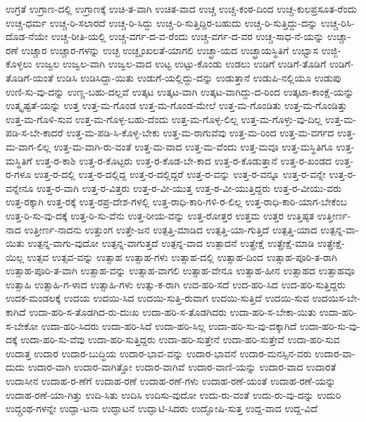 {ಉಗ್ರತೆ
ಉಗ್ರಾಣ-ದಲ್ಲಿ
ಉಗ್ರಾಣಕ್ಕೆ
ಉಚಿ-ತ-ವಾಗಿ
ಉಚಿತ-ವಾದ
ಉಚ್ಚ
ಉಚ್ಚ-ಕಂಠ-ದಿಂದ
ಉಚ್ಚ-ಕುಲಪ್ರಸೂತ-ರೆಂದು
ಉಚ್ಚ-ಧರ್ಮ
ಉಚ್ಚ-ರಿ-ಸಲಾರದೆ
ಉಚ್ಚ-ರಿ-ಸಿದ್ದು
ಉಚ್ಚ-ರಿ-ಸುತ್ತಿದ್ದಿರ-ಬಹುದು
ಉಚ್ಚ-ರಿ-ಸುತ್ತಿದ್ದು-ದನ್ನು
ಉಚ್ಚ-ರಿಸಿ-ದೊಡ-ನೆಯೇ
ಉಚ್ಚ-ರೀತಿ-ಯಲ್ಲಿ
ಉಚ್ಚ-ವರ್ಗ-ದ-ವ-ರೆಂದು
ಉಚ್ಚ-ವರ್ಗ-ದ-ವರ
ಉಚ್ಚ-ಸಾಧ-ನೆ-ಯನ್ನು
ಉಚ್ಚಾ-ರಣೆ
ಉಚ್ಚಾರ
ಉಚ್ಚಾರ-ಗಳನ್ನು
ಉಚ್ಛ
ಉಚ್ಛೃಂಖಲತೆ-ಯಾಗಲಿ
ಉಚ್ಛ್ರಾ-ಯದ
ಉಚ್ಛ್ರಾಯಸ್ಥಿತಿಗೆ
ಉಛ್ವಾಸ
ಉಜ್ಜಿ-ಕೊಳ್ಳಲು
ಉಜ್ವಲ
ಉಜ್ವಲ-ವಾಗಿ
ಉಜ್ವಲ-ವಾದ
ಉಟ್ಟ
ಉಟ್ಟು-ಕೊಂಡು
ಉಡಲು
ಉಡಿಗೆ
ಉಡಿಗೆ-ತೊಡಿಗೆ
ಉಡಿಗೆ-ತೊಡಿಗೆ-ಯಂತೆ
ಉಡಿಸಿ
ಉಡಿಸಿದ್ದಾ-ಯಿತು
ಉಡುಗೆ-ಯಲ್ಲಿದ್ದು-ದನ್ನು
ಉಡುತ್ತಾನೆ
ಉಡುಪಿ-ನಲ್ಲಿಯೂ
ಉಡುಪು
ಉಣಿ-ಸು-ವು-ದನ್ನು
ಉಣ್ಣ-ಬಹು-ದಲ್ಲವೆ
ಉತ್ಕಟ
ಉತ್ಕಟ-ವಾಗಿ
ಉತ್ಕಟ-ವಾಗಿದ್ದು-ದ-ರಿಂದ
ಉತ್ಕಟಾ-ಕಾಂಕ್ಷೆ-ಯನ್ನು
ಉತ್ಕೃಷ್ಟತೆ-ಯನ್ನು
ಉತ್ತ
ಉತ್ತ-ಮ-ಗೊಂಡ
ಉತ್ತ-ಮ-ಗೊಂಡ-ಮೇಲೆ
ಉತ್ತ-ಮ-ಗೊಂಡಿತು
ಉತ್ತ-ಮ-ಗೊಂಡಿತ್ತು
ಉತ್ತ-ಮ-ಗೊಳಿ-ಸುವ
ಉತ್ತ-ಮ-ಗೊಳ್ಳ-ಬಹು-ದೆಂದು
ಉತ್ತ-ಮ-ಗೊಳ್ಳ-ಲಿಲ್ಲ
ಉತ್ತ-ಮ-ಗೊಳ್ಳು-ವು-ದಿಲ್ಲ
ಉತ್ತ-ಮ-ಪಡಿ-ಸ-ಬೇ-ಕಾದರೆ
ಉತ್ತ-ಮ-ಪಡಿ-ಸಿ-ಕೊಳ್ಳ-ಬೇಕು
ಉತ್ತ-ಮ-ರಾಗುವೆವು
ಉತ್ತ-ಮ-ರಿಂದ
ಉತ್ತ-ಮ-ವರ್ಗದ
ಉತ್ತ-ಮ-ವಾಗ-ಲಿಲ್ಲ
ಉತ್ತ-ಮ-ವಾಗಿ-ರು-ವಂತೆ
ಉತ್ತ-ಮ-ವಾದ
ಉತ್ತ-ಮ-ವೆಂದು
ಉತ್ತ-ಮವೂ
ಉತ್ತ-ಮಸ್ಥಿತಿಗೂ
ಉತ್ತ-ಮಸ್ಥಿತಿಗೆ
ಉತ್ತ-ರ-ಕಾಶಿ
ಉತ್ತ-ರ-ಕೊಟ್ಟರು
ಉತ್ತ-ರ-ಕೊಡ-ಬೇ-ಕಾದ
ಉತ್ತ-ರ-ಕೊಡುತ್ತಾನೆ
ಉತ್ತ-ರ-ಖಂಡದ
ಉತ್ತ-ರ-ಗಳೂ
ಉತ್ತ-ರ-ದಲ್ಲಿ
ಉತ್ತ-ರ-ದಲ್ಲಿದ್ದ
ಉತ್ತ-ರ-ದಲ್ಲಿದ್ದರೆ
ಉತ್ತ-ರ-ವನ್ನು
ಉತ್ತ-ರ-ವನ್ನೂ
ಉತ್ತ-ರ-ವನ್ನೇ
ಉತ್ತ-ರ-ವನ್ನೇನೂ
ಉತ್ತ-ರ-ವಾಗಿ
ಉತ್ತ-ರ-ವಿತ್ತರು
ಉತ್ತ-ರ-ವೀ-ಯುತ್ತ
ಉತ್ತ-ರ-ವೀ-ಯುತ್ತಿದ್ದರು
ಉತ್ತ-ರ-ವೀಯು-ವರು
ಉತ್ತ-ರಕ್ಕಾಗಿ
ಉತ್ತ-ರಕ್ಕೆ
ಉತ್ತ-ರಪ್ರ-ದೇಶ-ಗಳಲ್ಲಿ
ಉತ್ತ-ರಾಧಿ-ಕಾರಿ-ಗಳಿ-ರ-ಲಿಲ್ಲ
ಉತ್ತ-ರಾಧಿ-ಕಾರಿ-ಯಾಗ-ಬೇಕೆಂಬ
ಉತ್ತ-ರಿ-ಸು-ವು-ದಕ್ಕೆ
ಉತ್ತ-ರಿ-ಸು-ವೆನು
ಉತ್ತ-ರೀಯ-ವನ್ನು
ಉತ್ತ-ರೋತ್ತರ
ಉತ್ತಮ
ಉತ್ತರ
ಉತ್ತಿಷ್ಠತ
ಉತ್ತೀರ್ಣ-ನಾದ
ಉತ್ತೀರ್ಣ-ನಾದನು
ಉತ್ತುಂಗ
ಉತ್ತೇ-ಜನ
ಉತ್ಪತ್ತಿ-ಮಾಡಿದ
ಉತ್ಪತ್ತಿ-ಯಾ-ಗುತ್ತಿದೆ
ಉತ್ಪತ್ತಿ-ಯಾದ
ಉತ್ಪನ್ನ-ವಾ-ಯಿತು
ಉತ್ಪನ್ನ-ವಾಗು-ವುದೋ
ಉತ್ಪನ್ನ-ವಾಗುತ್ತದೆ
ಉತ್ಪನ್ನ-ವಾದ
ಉತ್ಪಾದನೆ
ಉತ್ಪ್ರೇಕ್ಷೆ
ಉತ್ಪ್ರೇಕ್ಷೆ-ಮಾಡಿ
ಉತ್ಪ್ರೇಕ್ಷೆ-ಯಿಲ್ಲ
ಉತ್ಸವ
ಉತ್ಸವ-ವನ್ನು
ಉತ್ಸಾಹ
ಉತ್ಸಾಹ-ಗಳು
ಉತ್ಸಾಹ-ದಲ್ಲಿ
ಉತ್ಸಾಹ-ದಿಂದ
ಉತ್ಸಾಹ-ಪೂರಿ-ತ-ರಾಗಿ
ಉತ್ಸಾಹ-ಪೂರಿ-ತ-ವಾಗಿ
ಉತ್ಸಾಹ-ವನ್ನು
ಉತ್ಸಾಹ-ವಾಗಲಿ
ಉತ್ಸಾಹ-ವೇನೂ
ಉತ್ಸಾಹ-ಹೀನ
ಉತ್ಸಾಹದ
ಉತ್ಸಾಹವೂ
ಉತ್ಸಾಹಿ
ಉತ್ಸಾಹಿ-ಗ-ಳಾದ
ಉತ್ಸಾಹಿ-ಗಳು
ಉತ್ಸು-ಕ-ರಾಗಿ
ಉದ-ಹರಿ-ಸದೆ
ಉದ-ಹರಿ-ಸಿದ
ಉದ-ಹರಿ-ಸುತ್ತಿದ್ದರು
ಉದಕ-ಮಂಡಲಕ್ಕೆ
ಉದಯ
ಉದಯಿ-ಸಿದ
ಉದಯಿ-ಸುತ್ತಿ-ರುವಾಗ
ಉದಯಿ-ಸುತ್ತಿದೆ
ಉದಯಿ-ಸುವ
ಉದಯಿಸ-ಬೇ-ಕಾಗಿದೆ
ಉದಾ-ಹರಿ-ಸ-ತೊಡಗಿದ-ರು-ದುಃಖ
ಉದಾ-ಹರಿ-ಸ-ತೊಡಗಿದರು
ಉದಾ-ಹರಿ-ಸ-ಬೇಕಾ-ಯಿತು
ಉದಾ-ಹರಿ-ಸ-ಬೇಕೋ
ಉದಾ-ಹರಿ-ಸಿದರು
ಉದಾ-ಹರಿ-ಸಿದೆ
ಉದಾ-ಹರಿ-ಸಿಲ್ಲ
ಉದಾ-ಹರಿ-ಸು-ವು-ದಕ್ಕಾಗಿದೆ
ಉದಾ-ಹರಿ-ಸು-ವು-ದಕ್ಕೆ
ಉದಾ-ಹರಿ-ಸು-ವೆವು
ಉದಾ-ಹರಿ-ಸುತ್ತಿದ್ದರು
ಉದಾ-ಹರಿ-ಸುತ್ತೇನೆ
ಉದಾ-ಹರಿ-ಸುತ್ತೇವೆ
ಉದಾ-ಹರಿ-ಸುವ
ಉದಾತ್ತ
ಉದಾರ
ಉದಾರ-ಬುದ್ಧಿಯ
ಉದಾರ-ಭಾವ-ವನ್ನು
ಉದಾರ-ಭಾವನೆ
ಉದಾರ-ಮನಸ್ಸಿನ-ವರು
ಉದಾರ-ವಾ-ದುದು
ಉದಾರ-ವಾಗಿ
ಉದಾರ-ವಾಗಿತ್ತೋ
ಉದಾರ-ವಾಗಿವೆ
ಉದಾರ-ವಾಣಿ-ಯನ್ನು
ಉದಾರ-ವಾದ
ಉದಾರತೆ
ಉದಾಸೀನ
ಉದಾಹ-ರ-ಣೆಗೆ
ಉದಾಹ-ರಣೆ
ಉದಾಹ-ರಣೆ-ಗಳು
ಉದಾಹ-ರಣೆ-ಯಂತೆ
ಉದಾಹ-ರಣೆ-ಯನ್ನು
ಉದಾಹ-ರಣೆ-ಯಾ-ಗಿತ್ತು
ಉದಿ-ಸಿತು
ಉದಿಸಿ
ಉದಿಸು-ವುದೋ
ಉದು-ರು-ವಂತೆ
ಉದು-ರು-ವು-ದನ್ನು
ಉದುರಿ
ಉದ್ಗ್ರಂಥ-ಗಳನ್ನೇ
ಉದ್ಘಾ-ಟನಾ
ಉದ್ಘಾಟನೆ
ಉದ್ಘಾಟಿ-ಸಿದರು
ಉದ್ಘೋಷಿ-ಸುತ್ತ
ಉದ್ದ-ವಾದ
ಉದ್ದ-ವಿದೆ
}
